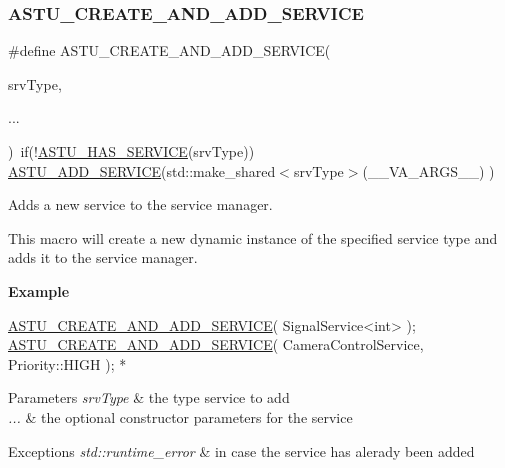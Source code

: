 \subsubsection{\texorpdfstring{A\+S\+T\+U\+\_\+\+C\+R\+E\+A\+T\+E\+\_\+\+A\+N\+D\+\_\+\+A\+D\+D\+\_\+\+S\+E\+R\+V\+I\+CE}{ASTU\_CREATE\_AND\_ADD\_SERVICE}}
{\footnotesize\ttfamily \#define A\+S\+T\+U\+\_\+\+C\+R\+E\+A\+T\+E\+\_\+\+A\+N\+D\+\_\+\+A\+D\+D\+\_\+\+S\+E\+R\+V\+I\+CE(\begin{DoxyParamCaption}\item[{}]{srv\+Type,  }\item[{}]{... }\end{DoxyParamCaption})~if(!\hyperlink{group__srv__group_ga8b3cd4edfd24593b12bc662acf62e9a1}{A\+S\+T\+U\+\_\+\+H\+A\+S\+\_\+\+S\+E\+R\+V\+I\+CE}(srv\+Type)) \hyperlink{group__srv__group_ga8c6572c2ee70b67d9dda0b8b0d77a7d2}{A\+S\+T\+U\+\_\+\+A\+D\+D\+\_\+\+S\+E\+R\+V\+I\+CE}(std\+::make\+\_\+shared$<$srv\+Type$>$(\+\_\+\+\_\+\+V\+A\+\_\+\+A\+R\+G\+S\+\_\+\+\_\+) )}

Adds a new service to the service manager.

This macro will create a new dynamic instance of the specified service type and adds it to the service manager.

{\bfseries Example}


\begin{DoxyCode}
\hyperlink{group__srv__group_ga91256015ad12618b8eda42106056a927}{ASTU\_CREATE\_AND\_ADD\_SERVICE}( SignalService<int> );
\hyperlink{group__srv__group_ga91256015ad12618b8eda42106056a927}{ASTU\_CREATE\_AND\_ADD\_SERVICE}( CameraControlService, Priority::HIGH ); * 
\end{DoxyCode}



\begin{DoxyParams}{Parameters}
{\em srv\+Type} & the type service to add \\
\hline
{\em ...} & the optional constructor parameters for the service \\
\hline
\end{DoxyParams}

\begin{DoxyExceptions}{Exceptions}
{\em std\+::runtime\+\_\+error} & in case the service has alerady been added \\
\hline
\end{DoxyExceptions}
\mbox{\label{group__srv__group_ga42e4ee34b527cd82ba6c0013b5d1441e}} 

